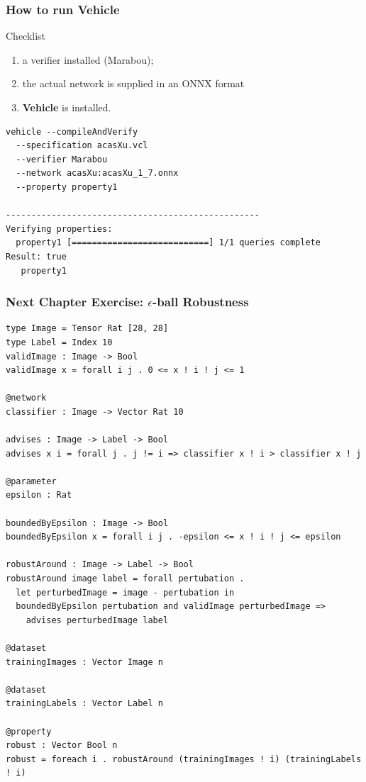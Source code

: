 \documentclass{beamer}
\begin{document}
\begin{frame}[fragile]
\frametitle{How to run Vehicle}
\begin{block}{Checklist}
\begin{enumerate}
\item a verifier installed (Marabou);
\item the actual network is supplied in an ONNX format
\item \textbf{Vehicle} is installed.
\end{enumerate}
\end{block}

\pause
\begin{verbatim}
vehicle --compileAndVerify
  --specification acasXu.vcl
  --verifier Marabou
  --network acasXu:acasXu_1_7.onnx
  --property property1

--------------------------------------------------
Verifying properties:
  property1 [===========================] 1/1 queries complete
Result: true
   property1
\end{verbatim}
\end{frame}

\begin{frame}[fragile]
\frametitle{Next Chapter Exercise: $\epsilon$-ball Robustness}
 \begin{verbatim}
type Image = Tensor Rat [28, 28]
type Label = Index 10
validImage : Image -> Bool
validImage x = forall i j . 0 <= x ! i ! j <= 1

@network
classifier : Image -> Vector Rat 10

advises : Image -> Label -> Bool
advises x i = forall j . j != i => classifier x ! i > classifier x ! j

@parameter
epsilon : Rat

boundedByEpsilon : Image -> Bool
boundedByEpsilon x = forall i j . -epsilon <= x ! i ! j <= epsilon

robustAround : Image -> Label -> Bool
robustAround image label = forall pertubation .
  let perturbedImage = image - pertubation in
  boundedByEpsilon pertubation and validImage perturbedImage =>
    advises perturbedImage label

@dataset
trainingImages : Vector Image n

@dataset
trainingLabels : Vector Label n

@property
robust : Vector Bool n
robust = foreach i . robustAround (trainingImages ! i) (trainingLabels ! i)
\end{verbatim}
\end{frame}
\end{document}
